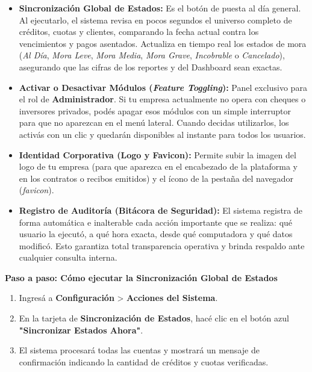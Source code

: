\documentclass[12pt,a4paper]{article}
\renewcommand{\_}{\textunderscore\allowbreak}
\begin{document}
\begin{itemize}
    \item \textbf{Sincronización Global de Estados:}
          Es el botón de puesta al día general. Al ejecutarlo, el sistema revisa en pocos segundos el universo completo de créditos, cuotas y clientes, comparando la fecha actual contra los vencimientos y pagos asentados. Actualiza en tiempo real los estados de mora (\textit{Al Día}, \textit{Mora Leve}, \textit{Mora Media}, \textit{Mora Grave}, \textit{Incobrable} o \textit{Cancelado}), asegurando que las cifras de los reportes y del Dashboard sean exactas.

    \item \textbf{Activar o Desactivar Módulos (\textit{Feature Toggling}):}
          Panel exclusivo para el rol de \textbf{Administrador}. Si tu empresa actualmente no opera con cheques o inversores privados, podés apagar esos módulos con un simple interruptor para que no aparezcan en el menú lateral. Cuando decidas utilizarlos, los activás con un clic y quedarán disponibles al instante para todos los usuarios.

    \item \textbf{Identidad Corporativa (Logo y Favicon):}
          Permite subir la imagen del logo de tu empresa (para que aparezca en el encabezado de la plataforma y en los contratos o recibos emitidos) y el ícono de la pestaña del navegador (\textit{favicon}).

    \item \textbf{Registro de Auditoría (Bitácora de Seguridad):}
          El sistema registra de forma automática e inalterable cada acción importante que se realiza: qué usuario la ejecutó, a qué hora exacta, desde qué computadora y qué datos modificó. Esto garantiza total transparencia operativa y brinda respaldo ante cualquier consulta interna.
\end{itemize}

\textbf{Paso a paso: Cómo ejecutar la Sincronización Global de Estados}
\begin{enumerate}
    \item Ingresá a \textbf{Configuración} > \textbf{Acciones del Sistema}.
    \item En la tarjeta de \textbf{Sincronización de Estados}, hacé clic en el botón azul \textbf{"Sincronizar Estados Ahora"}.
    \item El sistema procesará todas las cuentas y mostrará un mensaje de confirmación indicando la cantidad de créditos y cuotas verificadas.
\end{enumerate}
\end{document}

